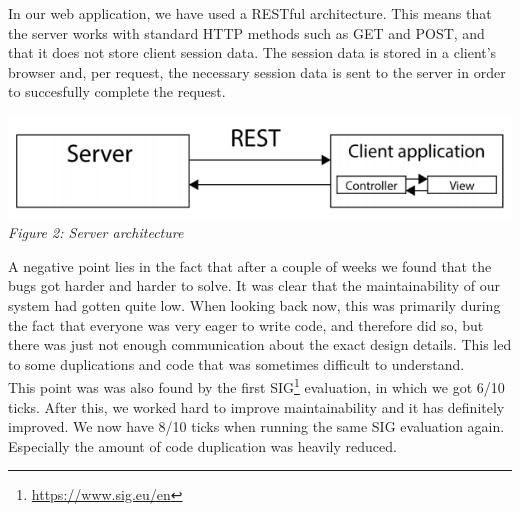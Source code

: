 In our web application, we have used a RESTful architecture. This means that the server works with standard HTTP methods such as GET and POST, and that it does not store client session data. The session data is stored in a client's browser and, per request, the necessary session data is sent to the server in order to succesfully complete the request.\\
\begin{center}
\includegraphics[scale=1]{./images/rest}\\
\textit{Figure 2: Server architecture}\\
\end{center}
A negative point lies in the fact that after a couple of weeks we found that the bugs got harder and harder to solve. It was clear that the maintainability of our system had gotten quite low. When looking back now, this was primarily during the fact that everyone was very eager to write code, and therefore did so, but there was just not enough communication about the exact design details. This led to some duplications and code that was sometimes difficult to understand.\\
This point was was also found by the first SIG\footnote{\url{https://www.sig.eu/en}} evaluation, in which we got 6/10 ticks. After this, we worked hard to improve maintainability and it has definitely improved. We now have 8/10 ticks when running the same SIG evaluation again. Especially the amount of code duplication was heavily reduced.\\


